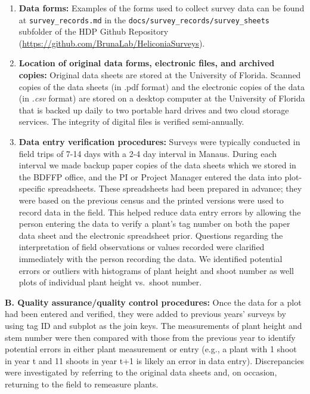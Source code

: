 \documentclass[
  man, donotrepeattitle,floatsintext]{apa6}
\begin{document}
\begin{enumerate}
\def\labelenumi{\arabic{enumi}.}
\item
  \textbf{Data forms:} Examples of the forms used to collect survey data can be found at \texttt{survey\_records.md} in the \texttt{docs/survey\_records/survey\_sheets} subfolder of the HDP Github Repository (\url{https://github.com/BrunaLab/HeliconiaSurveys}).
\item
  \textbf{Location of original data forms, electronic files, and archived copies:} Original data sheets are stored at the University of Florida. Scanned copies of the data sheets (in .pdf format) and the electronic copies of the data (in \emph{.csv} format) are stored on a desktop computer at the University of Florida that is backed up daily to two portable hard drives and two cloud storage services. The integrity of digital files is verified semi-annually.
\item
  \textbf{Data entry verification procedures:} Surveys were typically conducted in field trips of 7-14 days with a 2-4 day interval in Manaus. During each interval we made backup paper copies of the data sheets which we stored in the BDFFP office, and the PI or Project Manager entered the data into plot-specific spreadsheets. These spreadsheets had been prepared in advance; they were based on the previous census and the printed versions were used to record data in the field. This helped reduce data entry errors by allowing the person entering the data to verify a plant's tag number on both the paper data sheet and the electronic spreadsheet prior. Questions regarding the interpretation of field observations or values recorded were clarified immediately with the person recording the data. We identified potential errors or outliers with histograms of plant height and shoot number as well plots of individual plant height vs.~shoot number.
\end{enumerate}

\noindent
\textbf{B. Quality assurance/quality control procedures:} Once the data for a plot had been entered and verified, they were added to previous years' surveys by using tag ID and subplot as the join keys. The measurements of plant height and stem number were then compared with those from the previous year to identify potential errors in either plant measurement or entry (e.g., a plant with 1 shoot in year t and 11 shoots in year t+1 is likely an error in data entry). Discrepancies were investigated by referring to the original data sheets and, on occasion, returning to the field to remeasure plants.
\end{document}
